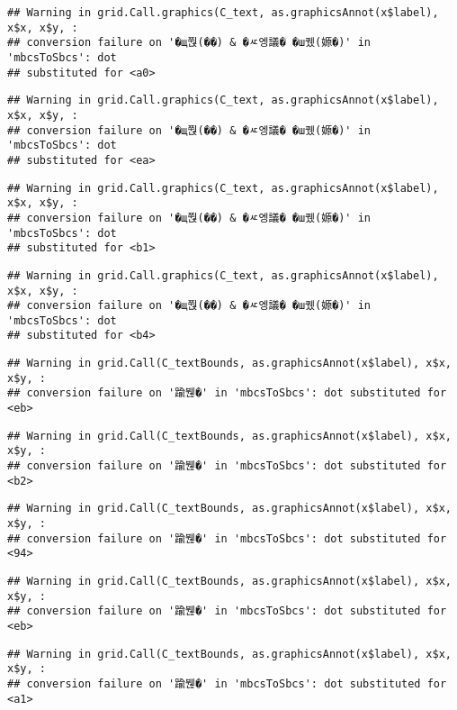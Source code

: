 \documentclass[
]{article}
\begin{document}
\begin{verbatim}
## Warning in grid.Call.graphics(C_text, as.graphicsAnnot(x$label), x$x, x$y, :
## conversion failure on '�щ쭩(��) & �ㅼ엥議� �ш퀬(嫄�)' in 'mbcsToSbcs': dot
## substituted for <a0>
\end{verbatim}

\begin{verbatim}
## Warning in grid.Call.graphics(C_text, as.graphicsAnnot(x$label), x$x, x$y, :
## conversion failure on '�щ쭩(��) & �ㅼ엥議� �ш퀬(嫄�)' in 'mbcsToSbcs': dot
## substituted for <ea>
\end{verbatim}

\begin{verbatim}
## Warning in grid.Call.graphics(C_text, as.graphicsAnnot(x$label), x$x, x$y, :
## conversion failure on '�щ쭩(��) & �ㅼ엥議� �ш퀬(嫄�)' in 'mbcsToSbcs': dot
## substituted for <b1>
\end{verbatim}

\begin{verbatim}
## Warning in grid.Call.graphics(C_text, as.graphicsAnnot(x$label), x$x, x$y, :
## conversion failure on '�щ쭩(��) & �ㅼ엥議� �ш퀬(嫄�)' in 'mbcsToSbcs': dot
## substituted for <b4>
\end{verbatim}

\begin{verbatim}
## Warning in grid.Call(C_textBounds, as.graphicsAnnot(x$label), x$x, x$y, :
## conversion failure on '踰붾�' in 'mbcsToSbcs': dot substituted for <eb>
\end{verbatim}

\begin{verbatim}
## Warning in grid.Call(C_textBounds, as.graphicsAnnot(x$label), x$x, x$y, :
## conversion failure on '踰붾�' in 'mbcsToSbcs': dot substituted for <b2>
\end{verbatim}

\begin{verbatim}
## Warning in grid.Call(C_textBounds, as.graphicsAnnot(x$label), x$x, x$y, :
## conversion failure on '踰붾�' in 'mbcsToSbcs': dot substituted for <94>
\end{verbatim}

\begin{verbatim}
## Warning in grid.Call(C_textBounds, as.graphicsAnnot(x$label), x$x, x$y, :
## conversion failure on '踰붾�' in 'mbcsToSbcs': dot substituted for <eb>
\end{verbatim}

\begin{verbatim}
## Warning in grid.Call(C_textBounds, as.graphicsAnnot(x$label), x$x, x$y, :
## conversion failure on '踰붾�' in 'mbcsToSbcs': dot substituted for <a1>
\end{verbatim}
\end{document}
